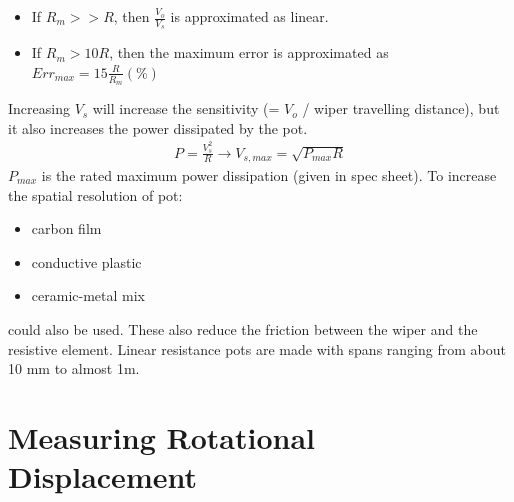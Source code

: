 \documentclass[class=report, crop=false, 12pt,a4paper]{standalone}
\begin{document}
\begin{itemize}
  \item If $R_m>>R$, then $\frac{V_o}{V_s}$ is approximated as linear.
  \item If $R_m>10R$, then the maximum error is approximated as $Err_{max} = 15\frac{R}{R_m}(\%)$
\end{itemize}
Increasing $V_s$ will increase the sensitivity (= $V_o$ / wiper travelling distance), but it also increases the power dissipated by the pot.
\begin{gather}
  P = \frac{V_s^2}{R} \longrightarrow V_{s,max} = \sqrt{P_{max}R}
\end{gather}
$P_{max}$ is the rated maximum power dissipation (given in spec sheet). To increase the spatial resolution of pot:
\begin{itemize}
  \item carbon film
  \item conductive plastic
  \item ceramic-metal mix
\end{itemize}
could also be used. These also reduce the friction between the wiper and the resistive element. Linear resistance pots are made with spans ranging from about 10 mm to almost 1m.
\section{Measuring Rotational Displacement}
\end{document}
